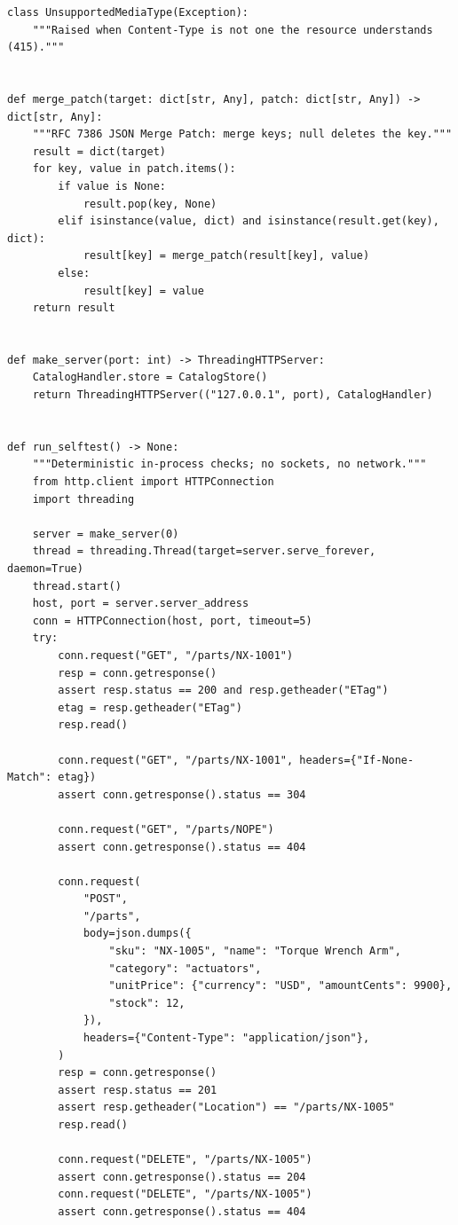 \begin{verbatim}
class UnsupportedMediaType(Exception):
    """Raised when Content-Type is not one the resource understands (415)."""


def merge_patch(target: dict[str, Any], patch: dict[str, Any]) -> dict[str, Any]:
    """RFC 7386 JSON Merge Patch: merge keys; null deletes the key."""
    result = dict(target)
    for key, value in patch.items():
        if value is None:
            result.pop(key, None)
        elif isinstance(value, dict) and isinstance(result.get(key), dict):
            result[key] = merge_patch(result[key], value)
        else:
            result[key] = value
    return result


def make_server(port: int) -> ThreadingHTTPServer:
    CatalogHandler.store = CatalogStore()
    return ThreadingHTTPServer(("127.0.0.1", port), CatalogHandler)


def run_selftest() -> None:
    """Deterministic in-process checks; no sockets, no network."""
    from http.client import HTTPConnection
    import threading

    server = make_server(0)
    thread = threading.Thread(target=server.serve_forever, daemon=True)
    thread.start()
    host, port = server.server_address
    conn = HTTPConnection(host, port, timeout=5)
    try:
        conn.request("GET", "/parts/NX-1001")
        resp = conn.getresponse()
        assert resp.status == 200 and resp.getheader("ETag")
        etag = resp.getheader("ETag")
        resp.read()

        conn.request("GET", "/parts/NX-1001", headers={"If-None-Match": etag})
        assert conn.getresponse().status == 304

        conn.request("GET", "/parts/NOPE")
        assert conn.getresponse().status == 404

        conn.request(
            "POST",
            "/parts",
            body=json.dumps({
                "sku": "NX-1005", "name": "Torque Wrench Arm",
                "category": "actuators",
                "unitPrice": {"currency": "USD", "amountCents": 9900},
                "stock": 12,
            }),
            headers={"Content-Type": "application/json"},
        )
        resp = conn.getresponse()
        assert resp.status == 201
        assert resp.getheader("Location") == "/parts/NX-1005"
        resp.read()

        conn.request("DELETE", "/parts/NX-1005")
        assert conn.getresponse().status == 204
        conn.request("DELETE", "/parts/NX-1005")
        assert conn.getresponse().status == 404


\end{verbatim}
